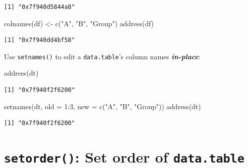 \documentclass[
]{book}
\newenvironment{Shaded}{\begin{snugshade}}{\end{snugshade}}
\newcommand{\AttributeTok}[1]{\textcolor[rgb]{0.77,0.63,0.00}{#1}}
\newcommand{\DecValTok}[1]{\textcolor[rgb]{0.00,0.00,0.81}{#1}}
\newcommand{\FunctionTok}[1]{\textcolor[rgb]{0.00,0.00,0.00}{#1}}
\newcommand{\NormalTok}[1]{#1}
\newcommand{\OtherTok}[1]{\textcolor[rgb]{0.56,0.35,0.01}{#1}}
\newcommand{\SpecialCharTok}[1]{\textcolor[rgb]{0.00,0.00,0.00}{#1}}
\newcommand{\StringTok}[1]{\textcolor[rgb]{0.31,0.60,0.02}{#1}}
\begin{document}
\begin{verbatim}
[1] "0x7f940d5844a8"
\end{verbatim}

\begin{Shaded}
\begin{Highlighting}[]
\FunctionTok{colnames}\NormalTok{(df) }\OtherTok{\textless{}{-}} \FunctionTok{c}\NormalTok{(}\StringTok{"A"}\NormalTok{, }\StringTok{"B"}\NormalTok{, }\StringTok{"Group"}\NormalTok{)}
\FunctionTok{address}\NormalTok{(df)}
\end{Highlighting}
\end{Shaded}

\begin{verbatim}
[1] "0x7f940dd4bf58"
\end{verbatim}

Use \texttt{setnames()} to edit a \texttt{data.table}'s column names \textbf{\emph{in-place}}:

\begin{Shaded}
\begin{Highlighting}[]
\FunctionTok{address}\NormalTok{(dt)}
\end{Highlighting}
\end{Shaded}

\begin{verbatim}
[1] "0x7f940f2f6200"
\end{verbatim}

\begin{Shaded}
\begin{Highlighting}[]
\FunctionTok{setnames}\NormalTok{(dt, }\AttributeTok{old =} \DecValTok{1}\SpecialCharTok{:}\DecValTok{3}\NormalTok{, }\AttributeTok{new =} \FunctionTok{c}\NormalTok{(}\StringTok{"A"}\NormalTok{, }\StringTok{"B"}\NormalTok{, }\StringTok{"Group"}\NormalTok{))}
\FunctionTok{address}\NormalTok{(dt)}
\end{Highlighting}
\end{Shaded}

\begin{verbatim}
[1] "0x7f940f2f6200"
\end{verbatim}

\hypertarget{setorder-set-order-of-data.table}{%
\section{\texorpdfstring{\texttt{setorder()}: Set order of \texttt{data.table}}{setorder(): Set order of data.table}}\label{setorder-set-order-of-data.table}}
\end{document}
